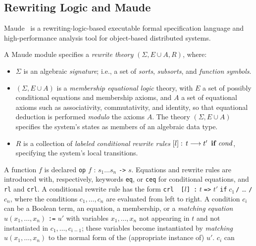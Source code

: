 \subsection{Rewriting Logic and Maude}

Maude~\cite{maude-book} is a rewriting-logic-based executable formal specification language and
high-performance analysis tool for object-based distributed systems.

\noindent
A Maude module specifies a 
 \emph{rewrite theory} $(\Sigma, E\cup A,  R)$, where:
\begin{itemize}
\item $\Sigma$ is an algebraic \emph{signature}; i.e., a set of 
\emph{sorts}, \emph{subsorts}, and \emph{function
    symbols}.  
\item $(\Sigma, E\cup A)$ is a \emph{membership equational
logic}
theory,  with  $E$ a set of possibly conditional 
equations and membership axioms,  and
$A$ a set of equational axioms such as 
associativity, commutativity, and identity, so that equational
deduction is performed \emph{modulo} the axioms $A$. 
The theory $(\Sigma, E\cup A)$
specifies
the system's states as members of an algebraic data type.
\item $R$
is a collection of {\em labeled conditional rewrite rules\/} \( [l]:\,
t\longrightarrow t'\,\mbox{ \bf if } \mathit{cond}\), specifying  
the system's local transitions. 
\end{itemize}
A function $f$ is  declared \texttt{op} $f$ : \(s_1\ldots s_n\)
\texttt{->} $s$.
Equations and rewrite rules are introduced with, respectively,
keywords {\tt eq}, or  {\tt ceq}  for 
conditional equations, and 
{\tt rl} and {\tt crl}.
A conditional rewrite rule has the form \texttt{crl\,\,[}$l$\texttt{]\,:}
$t\;$\texttt{=>}$\,\,t'\;$\texttt{if}$\;c_1\,$\texttt{/} \ldots
\texttt{/} $c_n$, where the  conditions $c_1,
\ldots, c_n$ are evaluated from left to right. A condition $c_i$ can be a
Boolean term, an equation, a membership, or a
\emph{matching equation} $u(x_1, \ldots, x_n)\,\,$\texttt{:=}$\,\,u'$
with  variables $x_1, \ldots, x_n$ not appearing in $t$ and not
instantiated in $c_1, \ldots, c_{i-1}$; these variables become
instantiated by \emph{matching} $u(x_1, \ldots, x_n)$ to the normal
form of the (appropriate  instance of) $u'$. $c_i$ can
